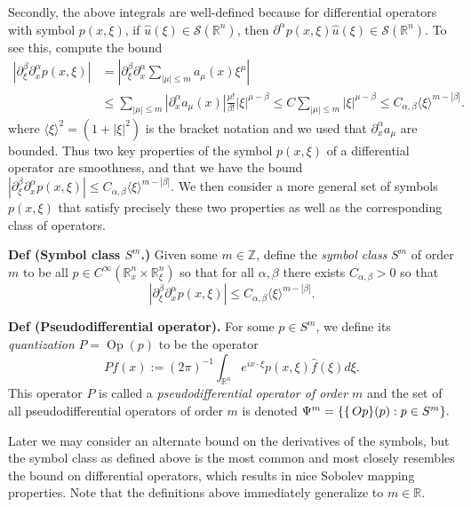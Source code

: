 \documentclass[
]{article}
\begin{document}
Secondly, the above integrals are well-defined because for differential
operators with symbol \(p(x, \xi)\), if
\(\hat{u}(\xi) \in \mathscr{S}(\mathbb{R}^n)\), then
\(\partial^{\alpha}p(x,\xi) \hat{u}(\xi) \in \mathscr{S}(\mathbb{R}^n)\).
To see this, compute the bound \begin{align}
    |\partial_{\xi}^{\beta} \partial_{x}^{\alpha} p(x,\xi)|
    &= \left|\partial_{\xi}^{\beta} \partial_{x}^{\alpha} \sum_{|\mu| \leq m} a_{\mu}(x)\xi^{\mu}\right|\\\
    &\leq \sum_{|\mu| \leq m} |\partial_x^{\alpha}a_{\mu}(x)|\frac{\mu!}{\beta!}|\xi|^{\mu-\beta}
    \leq C\sum_{|\mu| \leq m}|\xi|^{\mu - \beta}
    \leq C_{\alpha, \beta} \langle \xi \rangle^{m - |\beta|}.
\end{align} where \(\langle \xi \rangle^2 = (1+|\xi|^2)\) is the bracket
notation and we used that \(\partial_x^{\alpha}a_{\mu}\) are bounded.
Thus two key properties of the symbol \(p(x,\xi)\) of a differential
operator are smoothness, and that we have the bound
\(|\partial_{\xi}^{\beta} \partial_{x}^{\alpha} p(x,\xi)| \leq C_{\alpha, \beta} \langle \xi \rangle^{m - |\beta|}\).
We then consider a more general set of symbols \(p(x, \xi)\) that
satisfy precisely these two properties as well as the corresponding
class of operators.

\textbf{Def (Symbol class \(S^m\).)} Given some \(m \in \mathbb{Z}\),
define the \emph{symbol class} \(S^m\) of order \(m\) to be all
\(p \in C^{\infty}(\mathbb{R}_x^{n} \times \mathbb{R}^n_{\xi})\) so that
for all \(\alpha, \beta\) there exists \(C_{\alpha, \beta} > 0\) so that
\[
    |\partial_{\xi}^{\beta}\partial_{x}^{\alpha}p(x, \xi)| \leq C_{\alpha, \beta}\langle \xi \rangle^{m-|\beta|}.
\]

\textbf{Def (Pseudodifferential operator).} For some \(p \in S^m\), we
define its \emph{quantization} \(P = \operatorname{Op}(p)\) to be the
operator \[
    Pf(x) := (2\pi)^{-1}\int_{\mathbb{R}^n} e^{ix \cdot \xi} p(x, \xi) \hat{f}(\xi)d\xi.
\] This operator \(P\) is called a \emph{pseudodifferential operator of
order \(m\)} and the set of all pseudodifferential operators of order
\(m\) is denoted \(\Psi^m = \{\operatorname\{Op\}(p): p \in S^m\}.\)

Later we may consider an alternate bound on the derivatives of the
symbols, but the symbol class as defined above is the most common and
most closely resembles the bound on differential operators, which
results in nice Sobolev mapping properties. Note that the definitions
above immediately generalize to \(m \in \mathbb{R}\).
\end{document}
